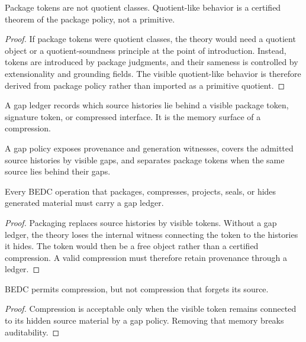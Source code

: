 \begin{theorem}
\label{thm:philosophy-packages-not-quotients}
Package tokens are not quotient classes. Quotient-like behavior is a
certified theorem of the package policy, not a primitive.
\end{theorem}
\begin{proof}
If package tokens were quotient classes, the theory would need a
quotient object or a quotient-soundness principle at the point of
introduction. Instead, tokens are introduced by package judgments, and
their sameness is controlled by extensionality and grounding fields.
The visible quotient-like behavior is therefore derived from package
policy rather than imported as a primitive quotient.
\end{proof}

\begin{definition}
\label{def:philosophy-gap-ledger}
A gap ledger records which source histories lie behind a visible
package token, signature token, or compressed interface. It is the
memory surface of a compression.
\end{definition}

\begin{definition}
\label{def:philosophy-gap-policy}
A gap policy exposes provenance and generation witnesses, covers the
admitted source histories by visible gaps, and separates package tokens
when the same source lies behind their gaps.
\end{definition}

\begin{theorem}
\label{thm:philosophy-compression-must-remember}
Every BEDC operation that packages, compresses, projects, seals, or
hides generated material must carry a gap ledger.
\end{theorem}
\begin{proof}
Packaging replaces source histories by visible tokens. Without a gap
ledger, the theory loses the internal witness connecting the token to
the histories it hides. The token would then be a free object rather
than a certified compression. A valid compression must therefore retain
provenance through a ledger.
\end{proof}

\begin{corollary}
\label{cor:philosophy-no-amnesic-compression}
BEDC permits compression, but not compression that forgets its source.
\end{corollary}
\begin{proof}
Compression is acceptable only when the visible token remains connected
to its hidden source material by a gap policy. Removing that memory
breaks auditability.
\end{proof}

